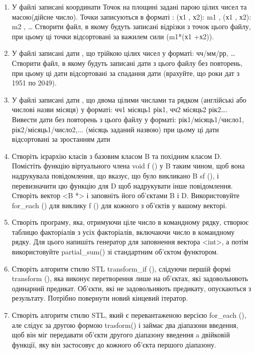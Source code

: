 \documentclass[a5paper,titlepage,openany,twoside,draft]{book_unv}%
\begin{document}
\begin{enumerate}
\item
  У файлі записані координати Точок на площині задані парою цілих чисел
  та масою(дійсне число). Точки записуються в форматі : (х1 , х2): m1 ,
  (х1 , х2): m2 , \ldots{} Створити файл, в якому будуть записані
  відрізки з точок цього файлу, при цьому ці точки відсортовані за
  важилем сили (m1*(х1 +х2)).
\item
  У файлі записані дати , що трійкою цілих чисел у форматі: чч/мм/рр,
  \ldots{} Створити файл, в якому будуть записані дати з цього файлу без
  повторень, при цьому ці дати відсортовані за спадання дати (врахуйте,
  що роки дат з 1951 по 2049).
\item
  У файлі записані дати , що двома цілими числами та рядком (англійські
  або числові назви місяця) у форматі: чч1 місяць1 рік1, чч2 місяць2
  рік2\ldots{}. Вивести дати без повторень з цього файлу у форматі:
  рік1/місяць1/число1, рік2/місяць1/число2,... (місяць заданий назвою)
  при цьому ці дати відсортовані за зростанням дати
\item
  Створіть ієрархію класів з базовим класом B та похідним класом D.
  Помістіть функцію віртуального члена void f () у B таким чином, щоб
  вона надрукувала повідомлення, що вказує, що було викликано B sf (), і
  перевизначити цю функцію для D щоб надрукувати інше повідомлення.
  Створіть вектор \textless{}B *\textgreater{} і заповніть його
  об'єктами B і D. Використовуйте for\_each () для виклику f () для
  кожного з об'єктів у вашому векторі.
\item
  Створіть програму, яка, отримуючи ціле число в командному рядку,
  створює таблицю факторіалів з усіх факторіалів, включаючи число в
  командному рядку. Для цього напишіть генератор для заповнення вектора
  \textless{}int\textgreater{}, а потім використовуйте partial\_sum() 
зі стандартним об'єктом функтором.

\item
  Створіть алгоритм стилю STL transform\_if (), слідуючи першій формі
  transform (), яка виконує перетворення лише на об'єктах, які
  задовольняють одинарний предикат. Об'єкти, які не задовольняють
  предикату, опускаються з результату. Потрібно повернути новий кінцевий
  ітератор.
\item
  Створіть алгоритм стилю STL, який є перевантаженою версією for\_each
  (), але слідує за другою формою trasform() і займає два діапазони
  введення, щоб він міг передавати об'єкти другого діапазону введення a
  двійковій функції, яку він застосовує до кожного об'єкта першого
  діапазону.


\end{enumerate}
\end{document}
